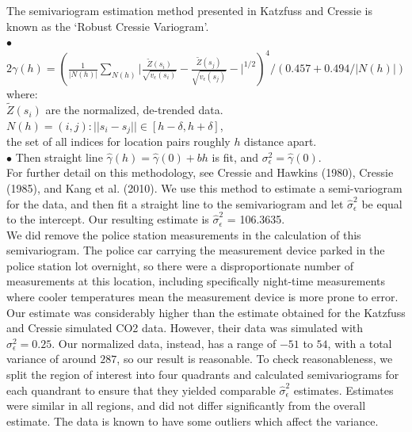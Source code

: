\documentclass[11pt]{article}
\newcommand{\myindent}{\hspace*{1cm}}
\begin{document}
The semivariogram estimation method presented in Katzfuss and Cressie is known as the `Robust Cressie Variogram'.  \\

\myindent $\bullet$ $2\gamma(h) = \left( \frac{1}{|N(h)|} \sum_{N(h)} \biggr\rvert
\frac{\tilde{Z}(s_i)}{\sqrt{v_\epsilon (s_i)}} - 
\frac{\tilde{Z}(s_j)}{\sqrt{v_\epsilon (s_j)}} - 
\biggr\rvert^{1/2} \right)^4 / \left(0.457 + 0.494 / |N(h)|\right)$ \\

\myindent\myindent where: \\
\myindent \myindent  $\tilde{Z}(s_i)$ are the normalized, de-trended data. \\
\myindent \myindent $N(h) = {(i,j): ||s_i - s_j|| \in [h - \delta, h + \delta ] }$, \\
\myindent \myindent \myindent the set of all indices for location pairs roughly $h$ distance apart.\\

\myindent $\bullet$ Then straight line $\hat{\gamma}(h) = \hat{\gamma}(0) + bh$ is fit, and $\sigma^2_\epsilon = \hat{\gamma}(0)$.\\

For further detail on this methodology, see Cressie and Hawkins (1980), Cressie (1985), and Kang et al. (2010). We use this method to estimate a semi-variogram for the data, and then fit a straight line to the semivariogram and let $\hat{\sigma}^2_\epsilon$ be equal to the intercept.  Our resulting estimate is $\hat{\sigma}^2_\epsilon$ = 106.3635. \\

We did remove the police station measurements in the calculation of this semivariogram.  The police car carrying the measurement device parked in the police station lot overnight, so there were a disproportionate number of measurements at this location, including specifically night-time measurements where cooler temperatures mean the measurement device is more prone to error. \\

Our estimate was considerably higher than the estimate obtained for the Katzfuss and Cressie simulated CO2 data.  However, their data was simulated with $\sigma^2_\epsilon = 0.25$. Our normalized data, instead, has a range of $-51$ to $54$, with a total variance of around $287$, so our result is reasonable. To check reasonableness, we split the region of interest into four quadrants and calculated semivariograms for each quandrant to ensure that they yielded comparable $\hat{\sigma}^2_\epsilon$ estimates. Estimates were similar in all regions, and did not differ significantly from the overall estimate.   The data is known to have some outliers which affect the variance.\\
\end{document}
